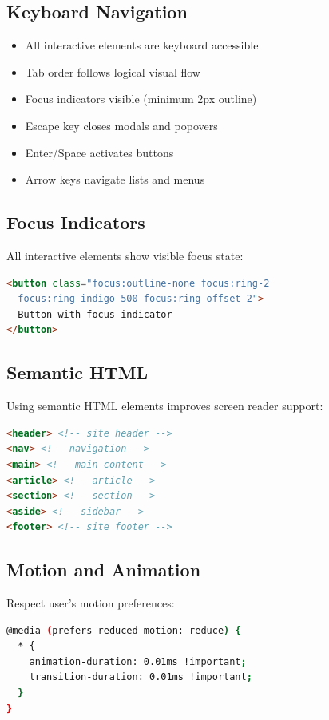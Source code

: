 \documentclass{report}
\begin{document}
\subsection{Keyboard Navigation}

\begin{itemize}
    \item All interactive elements are keyboard accessible
    \item Tab order follows logical visual flow
    \item Focus indicators visible (minimum 2px outline)
    \item Escape key closes modals and popovers
    \item Enter/Space activates buttons
    \item Arrow keys navigate lists and menus
\end{itemize}

\subsection{Focus Indicators}

All interactive elements show visible focus state:

\begin{lstlisting}[language=HTML]
<button class="focus:outline-none focus:ring-2 
  focus:ring-indigo-500 focus:ring-offset-2">
  Button with focus indicator
</button>
\end{lstlisting}

\subsection{Semantic HTML}

Using semantic HTML elements improves screen reader support:

\begin{lstlisting}[language=HTML]
<header> <!-- site header -->
<nav> <!-- navigation -->
<main> <!-- main content -->
<article> <!-- article -->
<section> <!-- section -->
<aside> <!-- sidebar -->
<footer> <!-- site footer -->
\end{lstlisting}

\subsection{Motion and Animation}

Respect user's motion preferences:

\begin{lstlisting}[language=bash]
@media (prefers-reduced-motion: reduce) {
  * {
    animation-duration: 0.01ms !important;
    transition-duration: 0.01ms !important;
  }
}
\end{lstlisting}
\end{document}
